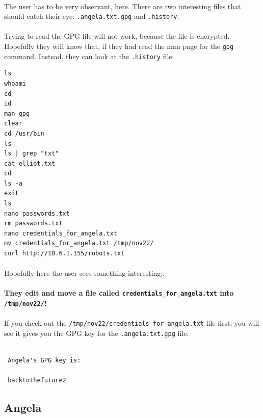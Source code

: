 \documentclass[11pt]{article}
\begin{document}
	\paragraph{} The user has to be very observant, here. There are two interesting files that should catch their eye: \texttt{.angela.txt.gpg} and \texttt{.history}.

	\paragraph{} Trying to read the GPG file will not work, because the file is encrypted. Hopefully they will know that, if they had read the man page for the \texttt{gpg} command. Instead, they can look at the \texttt{.history} file:

	\begin{lstlisting}[]
ls
whoami
cd
id
man gpg
clear
cd /usr/bin
ls
ls | grep "txt"
cat elliot.txt
cd
ls -a
exit
ls
nano passwords.txt
rm passwords.txt
nano credentials_for_angela.txt
mv credentials_for_angela.txt /tmp/nov22/
curl http://10.6.1.155/robots.txt
\end{lstlisting}

	\paragraph{} Hopefully here the user sees something interesting:.

	\paragraph{} \textbf{They edit and move a file called \texttt{credentials\_for\_angela.txt} into \texttt{/tmp/nov22/}!}

	\paragraph{} If you check out the \texttt{/tmp/nov22/credentials\_for\_angela.txt} file first, you will see it gives you the GPG key for the \texttt{.angela.txt.gpg} file.

\begin{lstlisting}[]

 Angela's GPG key is:

 backtothefuture2

		\end{lstlisting}

	\newpage

	\subsection{Angela}
\end{document}
